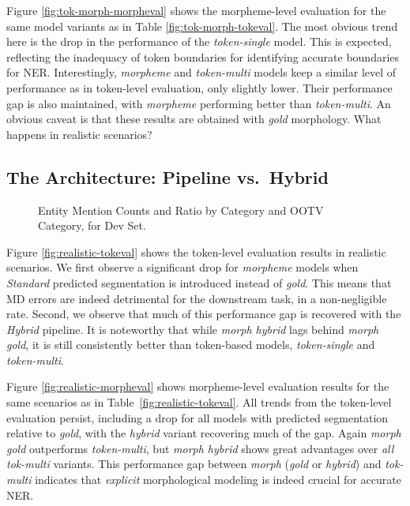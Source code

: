 \documentclass[11pt,a4paper]{article}
\newcommand{\TOKMACRO}{{\em token-single}\xspace}
\newcommand{\MULMACRO}{{\em token-multi}\xspace}
\newcommand{\MORMACRO}{{\em morpheme}\xspace}
\newcommand{\FLIPMACRO}{{\em Hybrid}\xspace}
\newcommand{\YAPMACRO}{{\em Standard}\xspace}
\begin{document}
Figure \ref{fig:tok-morph-morpheval} shows the morpheme-level evaluation for the same model variants as in Table \ref{fig:tok-morph-tokeval}. The most obvious trend here is the drop in the performance of the \TOKMACRO model. This is expected, reflecting the inadequacy of token boundaries for  identifying accurate boundaries for NER. Interestingly, \MORMACRO and \MULMACRO models keep a  similar level of performance as in token-level evaluation, only  slightly lower. Their performance gap is  also maintained,  with \MORMACRO performing better than \MULMACRO. An obvious caveat is that these results are obtained with {\em gold} morphology. What happens in realistic scenarios?

\subsection{The Architecture: Pipeline vs.\ Hybrid}
\label{sec:architectures-pipeline-hybrid}


\begin{figure}[t]
  \caption{\label{fig:analysis_ment_cat_ootv} 
  Entity Mention Counts and Ratio by Category and OOTV Category, for Dev Set.}
\end{figure}



Figure \ref{fig:realistic-tokeval} shows  the token-level evaluation results in realistic  scenarios. We first observe a significant drop for \MORMACRO models when \YAPMACRO predicted  segmentation is introduced instead of {\em gold}.   This means that MD errors are indeed detrimental for the downstream task, in a non-negligible rate. Second, we observe that much of this performance gap  is recovered with the \FLIPMACRO pipeline. 
It is noteworthy that while {\em morph hybrid} lags behind {\em morph gold}, it is still consistently better  than token-based models, \TOKMACRO and \MULMACRO.

Figure \ref{fig:realistic-morpheval} shows morpheme-level evaluation results for the same scenarios as in Table~\ref{fig:realistic-tokeval}. 
All trends from the token-level evaluation persist, including  a drop for all models with predicted segmentation relative to {\em gold}, with the {\em hybrid} variant recovering much of the gap.
Again {\em morph gold}  outperforms \MULMACRO, but {\em morph hybrid} shows great advantages over {\em all} {\em tok-multi} variants. This  performance gap  between {\em morph} ({\em gold} or {\em hybrid}) and {\em tok-multi} indicates that {\em explicit} morphological modeling is indeed crucial for  accurate NER. 
\end{document}
